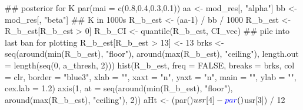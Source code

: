 \documentclass[11pt,]{article}
\newenvironment{Shaded}{}{}
\newcommand{\CommentTok}[1]{\textcolor[rgb]{0.00,0.50,0.00}{#1}}
\newcommand{\DataTypeTok}[1]{#1}
\newcommand{\DecValTok}[1]{#1}
\newcommand{\FloatTok}[1]{#1}
\newcommand{\KeywordTok}[1]{\textcolor[rgb]{0.00,0.00,1.00}{#1}}
\newcommand{\NormalTok}[1]{#1}
\newcommand{\OperatorTok}[1]{#1}
\newcommand{\OtherTok}[1]{\textcolor[rgb]{1.00,0.25,0.00}{#1}}
\newcommand{\StringTok}[1]{\textcolor[rgb]{0.00,0.50,0.50}{#1}}
\begin{document}
\begin{Shaded}
\begin{Highlighting}[]
\CommentTok{## posterior for K}
\KeywordTok{par}\NormalTok{(}\DataTypeTok{mai =} \KeywordTok{c}\NormalTok{(}\FloatTok{0.8}\NormalTok{,}\FloatTok{0.4}\NormalTok{,}\FloatTok{0.3}\NormalTok{,}\FloatTok{0.1}\NormalTok{))}
\NormalTok{aa <-}\StringTok{ }\NormalTok{mod_res[, }\StringTok{"alpha"}\NormalTok{]}
\NormalTok{bb <-}\StringTok{ }\NormalTok{mod_res[, }\StringTok{"beta"}\NormalTok{]}
\CommentTok{## K in 1000s}
\NormalTok{R_b_est <-}\StringTok{ }\NormalTok{(aa}\DecValTok{-1}\NormalTok{) }\OperatorTok{/}\StringTok{ }\NormalTok{bb }\OperatorTok{/}\StringTok{ }\DecValTok{1000}
\NormalTok{R_b_est <-}\StringTok{ }\NormalTok{R_b_est[R_b_est }\OperatorTok{>}\StringTok{ }\DecValTok{0}\NormalTok{]}
\NormalTok{R_b_CI <-}\StringTok{ }\KeywordTok{quantile}\NormalTok{(R_b_est, CI_vec)}
\CommentTok{## pile into last ban for plotting}
\NormalTok{R_b_est[R_b_est }\OperatorTok{>}\StringTok{ }\DecValTok{13}\NormalTok{] <-}\StringTok{ }\DecValTok{13}
\NormalTok{brks <-}\StringTok{ }\KeywordTok{seq}\NormalTok{(}\KeywordTok{around}\NormalTok{(}\KeywordTok{min}\NormalTok{(R_b_est), }\StringTok{"floor"}\NormalTok{),}
            \KeywordTok{around}\NormalTok{(}\KeywordTok{max}\NormalTok{(R_b_est), }\StringTok{"ceiling"}\NormalTok{),}
            \DataTypeTok{length.out =} \KeywordTok{length}\NormalTok{(}\KeywordTok{seq}\NormalTok{(}\DecValTok{0}\NormalTok{, a_thresh, }\DecValTok{2}\NormalTok{)))}
\KeywordTok{hist}\NormalTok{(R_b_est, }\DataTypeTok{freq =} \OtherTok{FALSE}\NormalTok{, }\DataTypeTok{breaks =}\NormalTok{ brks, }\DataTypeTok{col =}\NormalTok{ clr, }\DataTypeTok{border =} \StringTok{"blue3"}\NormalTok{,}
     \DataTypeTok{xlab =} \StringTok{""}\NormalTok{, }\DataTypeTok{xaxt =} \StringTok{"n"}\NormalTok{, }\DataTypeTok{yaxt =} \StringTok{"n"}\NormalTok{,}
     \DataTypeTok{main =} \StringTok{""}\NormalTok{, }\DataTypeTok{ylab =} \StringTok{""}\NormalTok{, }\DataTypeTok{cex.lab =} \FloatTok{1.2}\NormalTok{)}
\KeywordTok{axis}\NormalTok{(}\DecValTok{1}\NormalTok{, }\DataTypeTok{at =} \KeywordTok{seq}\NormalTok{(}\KeywordTok{around}\NormalTok{(}\KeywordTok{min}\NormalTok{(R_b_est), }\StringTok{"floor"}\NormalTok{),}
                 \KeywordTok{around}\NormalTok{(}\KeywordTok{max}\NormalTok{(R_b_est), }\StringTok{"ceiling"}\NormalTok{),}
                 \DecValTok{2}\NormalTok{))}
\NormalTok{aHt <-}\StringTok{ }\NormalTok{(}\KeywordTok{par}\NormalTok{()}\OperatorTok{$}\NormalTok{usr[}\DecValTok{4}\NormalTok{] }\OperatorTok{-}\StringTok{ }\KeywordTok{par}\NormalTok{()}\OperatorTok{$}\NormalTok{usr[}\DecValTok{3}\NormalTok{]) }\OperatorTok{/}\StringTok{ }\DecValTok{12}

\end{Highlighting}
\end{Shaded}
\end{document}
